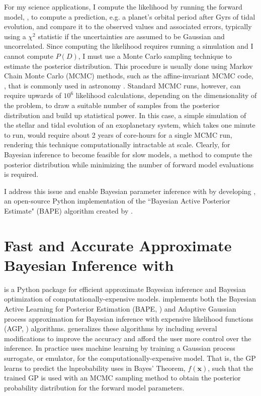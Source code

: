 For my science applications, I compute the likelihood by running the forward model, \vplanet, to compute a prediction, e.g. a planet's orbital period after Gyrs of tidal evolution, and compare it to the observed values and associated errors, typically using a $\chi^2$ statistic if the uncertainties are assumed to be Gaussian and uncorrelated. Since computing the likelihood requires running a \vplanet simulation and I cannot compute $P(D)$, I must use a Monte Carlo sampling technique to estimate the posterior distribution. This procedure is usually done using Markov Chain Monte Carlo (MCMC) methods, such as the affine-invariant MCMC code, \emcee, that is commonly used in astronomy \citep{ForemanMackey2013}. Standard MCMC runs, however, can require upwards of $10^6$ likelihood calculations, depending on the dimensionality of the problem, to draw a suitable number of samples from the posterior distribution and build up statistical power.  In this case, a simple \vplanet simulation of the stellar and tidal evolution of an exoplanetary system, which takes one minute to run, would require about 2 years of core-hours for a single MCMC run, rendering this technique computationally intractable at scale. Clearly, for Bayesian inference to become feasible for slow models, a method to compute the posterior distribution while minimizing the number of forward model evaluations is required. 

I address this issue and enable Bayesian parameter inference with \vplanet by developing \approxposterior, an open-source Python implementation of the ``Bayesian Active Posterior Estimate" (BAPE) algorithm created by \citet{Kandasamy2017}.

\section{Fast and Accurate Approximate Bayesian Inference with \approxposterior}

\approxposterior is a Python package for efficient approximate Bayesian inference and Bayesian optimization of computationally-expensive models. \approxposterior implements both the Bayesian Active Learning for Posterior Estimation (BAPE, \citet{Kandasamy2017}) and Adaptive Gaussian process approximation for Bayesian inference with expensive likelihood functions (AGP, \citet{Wang2018}) algorithms. \approxposterior generalizes these algorithms by including several modifications to improve the accuracy and afford the user more control over the inference. In practice \approxposterior uses machine learning by training a Gaussian process \citep[GP][]{Rasmussen2006} surrogate, or emulator, for the computationally-expensive model. That is, the GP learns to predict the lnprobability uses in Bayes' Theorem, $f(\textbf{x})$, such that the trained GP is used with an MCMC sampling method to obtain the posterior probability distribution for the forward model parameters. 

